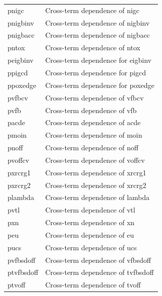 \begin{longtable}{l l}
{\small pnigc} & {\small Cross-term dependence of nigc} \\
{\small pnigbinv} & {\small Cross-term dependence of nigbinv} \\
{\small pnigbacc} & {\small Cross-term dependence of nigbacc} \\
{\small pntox} & {\small Cross-term dependence of ntox} \\
{\small peigbinv} & {\small Cross-term dependence for eigbinv} \\
{\small ppigcd} & {\small Cross-term dependence for pigcd} \\
{\small ppoxedge} & {\small Cross-term dependence for poxedge} \\
{\small pvfbcv} & {\small Cross-term dependence of vfbcv} \\
{\small pvfb} & {\small Cross-term dependence of vfb} \\
{\small pacde} & {\small Cross-term dependence of acde} \\
{\small pmoin} & {\small Cross-term dependence of moin} \\
{\small pnoff} & {\small Cross-term dependence of noff} \\
{\small pvoffcv} & {\small Cross-term dependence of voffcv} \\
{\small pxrcrg1} & {\small Cross-term dependence of xrcrg1} \\
{\small pxrcrg2} & {\small Cross-term dependence of xrcrg2} \\
{\small plambda} & {\small Cross-term dependence of lambda} \\
{\small pvtl} & {\small Cross-term dependence of vtl} \\
{\small pxn} & {\small Cross-term dependence of xn} \\
{\small peu} & {\small Cross-term dependence of eu} \\
{\small pucs} & {\small Cross-term dependence of ucs} \\
{\small pvfbsdoff} & {\small Cross-term dependence of vfbsdoff} \\
{\small ptvfbsdoff} & {\small Cross-term dependence of tvfbsdoff} \\
{\small ptvoff} & {\small Cross-term dependence of tvoff} \\



\end{longtable}
